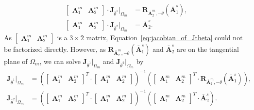 \begin{equation}
	\begin{split}
		\begin{bmatrix}
			\mathbf{A}_1^m & \mathbf{A}_2^m
		\end{bmatrix} \cdot \mathbf{J}_{\bar{\theta}^1}\vert_{\Omega_m} &= \mathbf{R}_{\bar{\mathbf{A}}^m_2,-\theta}(\bar{\mathbf{A}}^s_1),\\
		\begin{bmatrix}
			\mathbf{A}_1^m & \mathbf{A}_2^m
		\end{bmatrix} \cdot \mathbf{J}_{\bar{\theta}^2}\vert_{\Omega_m} &= \bar{\mathbf{A}}^s_2.
	\end{split}\label{eq:jacobian_of_Jtheta}
\end{equation}
As $\begin{bmatrix}
		\mathbf{A}_1^m & \mathbf{A}_2^m
	\end{bmatrix}$ is a $3\times 2$ matrix, Equation~\eqref{eq:jacobian_of_Jtheta} could not be factorized directly. However, as $\mathbf{R}_{\bar{\mathbf{A}}^m_2,-\theta}(\bar{\mathbf{A}}^s_1)$ and $\bar{\mathbf{A}}^s_2$ are on the tangential plane of $\Omega_m$, we can solve $\mathbf{J}_{\bar{\theta}^1}\vert_{\Omega_m}$ and $\mathbf{J}_{\bar{\theta}^2}\vert_{\Omega_m}$ by
\begin{equation}
	\begin{split}
		\mathbf{J}_{\bar{\theta}^1}\vert_{\Omega_m} &= \left(\begin{bmatrix}
			\mathbf{A}_1^m & \mathbf{A}_2^m
		\end{bmatrix}^T\cdot\begin{bmatrix}
			\mathbf{A}_1^m & \mathbf{A}_2^m
		\end{bmatrix}\right)^{-1}\left(\begin{bmatrix}
			\mathbf{A}_1^m & \mathbf{A}_2^m
		\end{bmatrix}^T\cdot\mathbf{R}_{\bar{\mathbf{A}}^m_2,-\theta}(\bar{\mathbf{A}}^s_1) \right),\\
		\mathbf{J}_{\bar{\theta}^2}\vert_{\Omega_m} &= \left(\begin{bmatrix}
			\mathbf{A}_1^m & \mathbf{A}_2^m
		\end{bmatrix}^T\cdot\begin{bmatrix}
			\mathbf{A}_1^m & \mathbf{A}_2^m
		\end{bmatrix}\right)^{-1}\left(\begin{bmatrix}
			\mathbf{A}_1^m & \mathbf{A}_2^m
		\end{bmatrix}^T\cdot\bar{\mathbf{A}}^s_2 \right).
	\end{split}
\end{equation}

